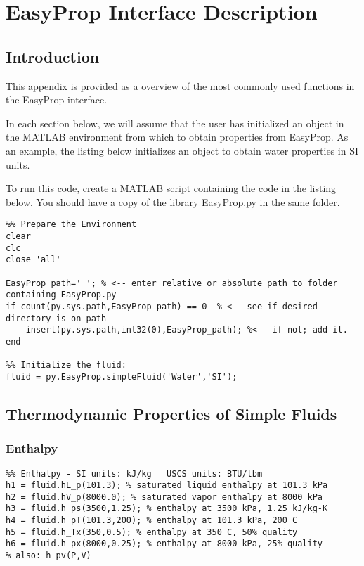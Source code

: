 \chapter{EasyProp Interface Description}
\label{ch:ep_interface}

\section{Introduction}
This appendix is provided as a overview of the most commonly used functions in the EasyProp interface.

In each section below, we will assume that the user has initialized an object in the MATLAB environment from which to obtain properties from EasyProp.  As an example, the listing below initializes an object to obtain water properties in SI units.

To run this code, create a MATLAB script containing the code in the listing below.  You should have a copy of the library EasyProp.py in the same folder.

\begin{fullwidth}
\begin{lstlisting}
%% Prepare the Environment
clear
clc
close 'all'

EasyProp_path=' '; % <-- enter relative or absolute path to folder containing EasyProp.py
if count(py.sys.path,EasyProp_path) == 0  % <-- see if desired directory is on path
    insert(py.sys.path,int32(0),EasyProp_path); %<-- if not; add it.
end

%% Initialize the fluid:
fluid = py.EasyProp.simpleFluid('Water','SI');
\end{lstlisting}
\end{fullwidth}

\section{Thermodynamic Properties of Simple Fluids}
\subsection{Enthalpy}

\begin{fullwidth}
\begin{lstlisting}
%% Enthalpy - SI units: kJ/kg   USCS units: BTU/lbm
h1 = fluid.hL_p(101.3); % saturated liquid enthalpy at 101.3 kPa
h2 = fluid.hV_p(8000.0); % saturated vapor enthalpy at 8000 kPa
h3 = fluid.h_ps(3500,1.25); % enthalpy at 3500 kPa, 1.25 kJ/kg-K
h4 = fluid.h_pT(101.3,200); % enthalpy at 101.3 kPa, 200 C
h5 = fluid.h_Tx(350,0.5); % enthalpy at 350 C, 50% quality
h6 = fluid.h_px(8000,0.25); % enthalpy at 8000 kPa, 25% quality
% also: h_pv(P,V)
\end{lstlisting}
\end{fullwidth}

